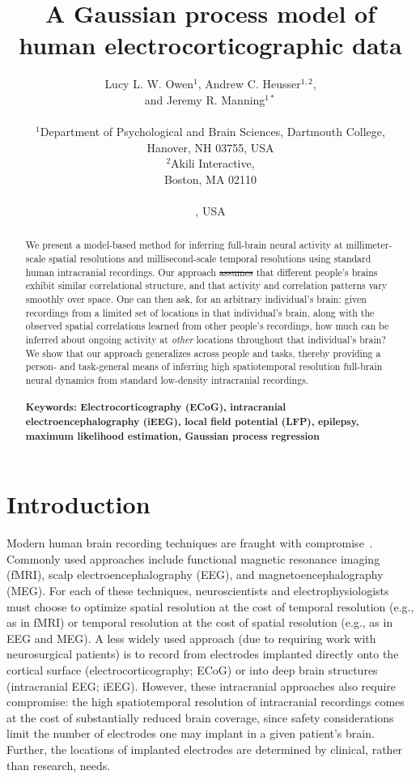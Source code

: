 \documentclass[10pt]{article}
\title{A Gaussian process model of human electrocorticographic data}
\author{
  Lucy L. W. Owen$^{1}$,
  \DIFaddbegin \DIFadd{Tudor A. Muntianu$^{1}$,
  }\DIFaddend Andrew C. Heusser$^{1, 2}$, \DIFaddbegin \\
  \DIFadd{Patrick Daly$^{3}$,
  Katherine Scangos$^{3}$, }\DIFaddend and
  Jeremy R. Manning$^{1\ast}$\\\\
$^{1}$Department of Psychological and Brain Sciences, Dartmouth College,\\
Hanover, NH 03755, USA\\
$^{2}$Akili Interactive,\\
Boston, MA 02110\DIFaddbegin \DIFadd{, USA}\\
\DIFadd{$^{3}$Weill Institute for Neurosciences, University of California, San Francisco,}\\
\DIFadd{San Francisco, CA 94121}\DIFaddend , USA}
\date{}
\providecommand{\DIFaddtex}[1]{{\protect\color{blue}\uwave{#1}}} %
\providecommand{\DIFdeltex}[1]{{\protect\color{red}\sout{#1}}}                      %
\providecommand{\DIFaddbegin}{} %
\providecommand{\DIFaddend}{} %
\providecommand{\DIFdelbegin}{} %
\providecommand{\DIFdelend}{} %
\providecommand{\DIFadd}[1]{\texorpdfstring{\DIFaddtex{#1}}{#1}} %
\providecommand{\DIFdel}[1]{\texorpdfstring{\DIFdeltex{#1}}{}} %
\newcommand{\DIFscaledelfig}{0.5}
\newlength{\DIFdelgraphicswidth} %
\newlength{\DIFdelgraphicsheight} %
\newcommand{\DIFaddincludegraphics}[2][]{{\color{blue}\fbox{\DIFOincludegraphics[#1]{#2}}}} %
\newcommand{\DIFdelincludegraphics}[2][]{%
\sbox{\DIFdelgraphicsbox}{\DIFOincludegraphics[#1]{#2}}%
\settoboxwidth{\DIFdelgraphicswidth}{\DIFdelgraphicsbox} %
\settoboxtotalheight{\DIFdelgraphicsheight}{\DIFdelgraphicsbox} %
\scalebox{\DIFscaledelfig}{%
\parbox[b]{\DIFdelgraphicswidth}{\usebox{\DIFdelgraphicsbox}\\[-\baselineskip] \rule{\DIFdelgraphicswidth}{0em}}\llap{\resizebox{\DIFdelgraphicswidth}{\DIFdelgraphicsheight}{%
\setlength{\unitlength}{\DIFdelgraphicswidth}%
\begin{picture}(1,1)%
\thicklines\linethickness{2pt} %
{\color[rgb]{1,0,0}\put(0,0){\framebox(1,1){}}}%
{\color[rgb]{1,0,0}\put(0,0){\line( 1,1){1}}}%
{\color[rgb]{1,0,0}\put(0,1){\line(1,-1){1}}}%
\end{picture}%
}\hspace*{3pt}}} %
} %
\DeclareRobustCommand{\DIFaddbegin}{\DIFOaddbegin \let\includegraphics\DIFaddincludegraphics} %
\DeclareRobustCommand{\DIFaddend}{\DIFOaddend \let\includegraphics\DIFOincludegraphics} %
\DeclareRobustCommand{\DIFdelbegin}{\DIFOdelbegin \let\includegraphics\DIFdelincludegraphics} %
\DeclareRobustCommand{\DIFdelend}{\DIFOaddend \let\includegraphics\DIFOincludegraphics} %
\begin{document}
\baselineskip24pt
\maketitle

\begin{abstract}
  We present a model-based method for inferring full-brain neural
  activity at millimeter-scale spatial resolutions and
  millisecond-scale temporal resolutions using standard human
  intracranial recordings.  Our approach \DIFdelbegin \DIFdel{assumes }\DIFdelend \DIFaddbegin \DIFadd{makes the simplifying
  assumptions }\DIFaddend that different people's brains exhibit similar
  correlational structure, and that activity and correlation patterns
  vary smoothly over space.  One can then ask, for an arbitrary
  individual's brain: given recordings from a limited set of locations
  in that individual's brain, along with the observed spatial
  correlations learned from other people's recordings, how much can be
  inferred about ongoing activity at \textit{other} locations
  throughout that individual's brain?  We show that our approach
  generalizes across people and tasks, thereby providing a person- and
  task-general means of inferring high spatiotemporal resolution
  full-brain neural dynamics from standard low-density intracranial
  recordings.
  \\\\
  \footnotesize{\textbf{Keywords: Electrocorticography (ECoG),
      intracranial electroencephalography (iEEG), local field
      potential (LFP), epilepsy, maximum likelihood estimation,
      Gaussian process regression}}
\end{abstract}

\section*{Introduction}
Modern human brain recording techniques are fraught with
compromise~\citep{SejnEtal14}.  Commonly used approaches include
functional magnetic resonance imaging (fMRI), scalp
electroencephalography (EEG), and magnetoencephalography (MEG).  For
each of these techniques, neuroscientists and electrophysiologists
must choose to optimize spatial resolution at the cost of temporal
resolution (e.g., as in fMRI) or temporal resolution at the cost of
spatial resolution (e.g., as in EEG and MEG).  A less widely used
approach (due to requiring work with neurosurgical patients) is to
record from electrodes implanted directly onto the cortical surface
(electrocorticography; ECoG) or into deep brain structures
(intracranial EEG; iEEG).  However, these intracranial approaches also
require compromise: the high spatiotemporal resolution of
intracranial recordings comes at the cost of substantially reduced
brain coverage, since safety considerations limit the number of
electrodes one may implant in a given patient's brain.  Further, the
locations of implanted electrodes are determined by clinical, rather
than research, needs.
\end{document}
